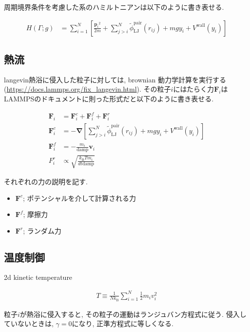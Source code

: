 \documentclass[dvipdfmx]{jsarticle}
\numberwithin{equation}{subsection}
\begin{document}
周期境界条件を考慮した系のハミルトニアンは以下のように書き表せる.

\begin{align}
  \label{Hamiltonian}
    H(\Gamma; g)
    &= \sum_{i=1}^{N}
    \left[
      \frac{{\bm{p}_i}^2}{2m} 
      + \sum_{j > i}^{N}
        \tilde{\phi}_{\text{LJ}}^{\text{pair}}(r_{ij})
      + mgy_i +V^{\text{wall}}(y_i)
    \right]
\end{align}



\subsection{熱流}

langevin熱浴に侵入した粒子に対しては, brownian 動力学計算を実行する(\url{https://docs.lammps.org/fix_langevin.html}). その粒子$i$にはたらく力$\bm{F}_i$はLAMMPSのドキュメントに則った形式だと以下のように書き表せる.

\begin{align}
  \bm{F}_i &= \bm{F}_i^c + \bm{F}_i^f + \bm{F}_i^r \\
  \bm{F}_i^c &= - \bm{\nabla} 
  \left[
    \sum_{j > i}^{N}
        \tilde{\phi}_{\text{LJ}}^{\text{pair}}(r_{ij})
      + mgy_i +V^{\text{wall}}(y_i)
  \right]  \\
  \bm{F}_i^f &= -\frac{m_i}{\text{damp}}\bm{v}_i \\
  F_i^r &\propto \sqrt{\frac{k_\text{B} Tm_i}{dt \text{damp}}}
\end{align}

それぞれの力の説明を記す.

\begin{itemize}
  \item $\bm{F}^c$; ポテンシャルを介して計算される力
  \item $\bm{F}^f$; 摩擦力
  \item $\bm{F}^r$; ランダム力
\end{itemize}


\subsection{温度制御}


2d kinetic temperature

\begin{align}
  T \equiv \frac{1}{Nk_{\text{B}}}\sum_{i=1}^{N} \frac{1}{2}m_i v_{i}^2
\end{align}

粒子$i$が熱浴に侵入すると, その粒子の運動はランジュバン方程式に従う. 侵入していないときは, $\gamma = 0$になり, 正準方程式に等しくなる.
\end{document}

